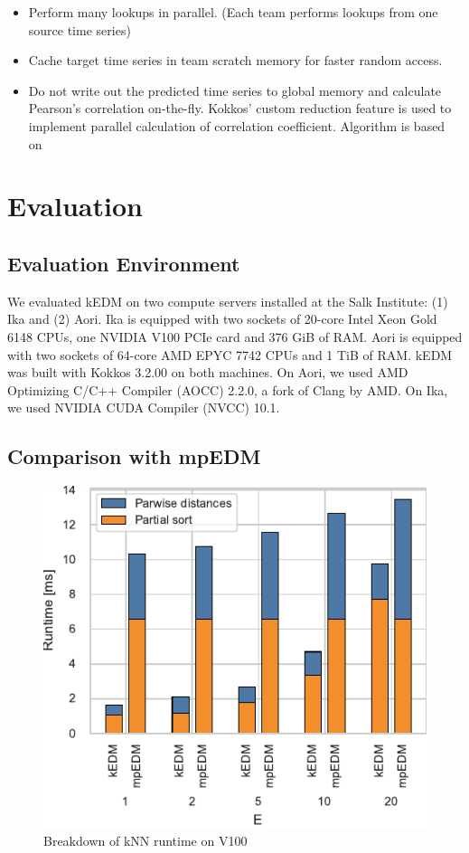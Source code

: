 \documentclass[conference]{IEEEtran}
\begin{document}
\begin{itemize}
\item Perform many lookups in parallel. (Each team performs lookups from one
    source time series)
\item Cache target time series in team scratch memory for faster random
    access.
\item Do not write out the predicted time series to global memory and
    calculate Pearson’s correlation on-the-fly. Kokkos’ custom reduction
    feature is used to implement parallel calculation of correlation
    coefficient. Algorithm is based on~\cite{Schubert2018}
\end{itemize}

\section{Evaluation}

\subsection{Evaluation Environment}


We evaluated kEDM on two compute servers installed at the Salk Institute: (1)
Ika and (2) Aori.
Ika is equipped with two sockets of 20-core Intel Xeon Gold 6148 CPUs, one
NVIDIA V100 PCIe card and 376 GiB of RAM. Aori is equipped with two sockets of
64-core AMD EPYC 7742 CPUs and 1 TiB of RAM.
kEDM was built with Kokkos 3.2.00 on both machines. On Aori, we used AMD
Optimizing C/C++ Compiler (AOCC) 2.2.0, a fork of Clang by AMD. On Ika, we
used NVIDIA CUDA Compiler (NVCC) 10.1.

\subsection{Comparison with mpEDM}

\begin{figure}
    \centering
    \includegraphics{figs/breakdown_knn_v100}
    \caption{Breakdown of kNN runtime on V100}%
    \label{fig:architecture}
\end{figure}
\end{document}

